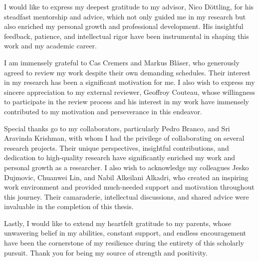 
 I would like to express my deepest gratitude to my advisor, Nico D\"ottling, for his steadfast mentorship and advice, which not only guided me in my research but also enriched my personal growth and professional development. His insightful feedback, patience, and intellectual rigor have been instrumental in shaping this work and my academic career.

I am immensely grateful to Cas Cremers and Markus Bl\"aser, who generously agreed to review my work despite their own demanding schedules. Their interest in my research has been a significant motivation for me. 
I also wish to express my sincere appreciation to my external reviewer, Geoffroy Couteau, whose willingness to participate in the review process and his interest in my work have immensely contributed to my motivation and perseverance in this endeavor. 

Special thanks go to my collaborators, particularly Pedro Branco, and Sri Aravinda Krishman, with whom I had the privilege of collaborating on several research projects. Their unique perspectives, insightful contributions, and dedication to high-quality research have significantly enriched my work and personal growth as a researcher.
I also wish to acknowledge my colleagues Jesko Dujmovic, Chuanwei Lin, and Nabil Alkeilani Alkadri, who created an inspiring work environment and provided much-needed support and motivation throughout this journey. Their camaraderie, intellectual discussions, and shared advice were invaluable in the completion of this thesis.

Lastly, I would like to extend my heartfelt gratitude to my parents, whose unwavering belief in my abilities, constant support, and endless encouragement have been the cornerstone of my resilience during the entirety of this scholarly pursuit. Thank you for being my source of strength and positivity.
